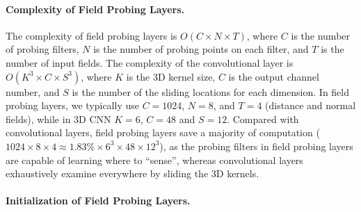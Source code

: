 
\paragraph{Complexity of Field Probing Layers.} The complexity of field probing layers is $O(C \times N \times T)$, where $C$ is the number of probing filters, $N$ is the number of probing points on each filter, and $T$ is the number of input fields. The complexity of the convolutional layer is $O(K^3 \times C \times S^3)$, where $K$ is the 3D kernel size, $C$ is the output channel number, and $S$ is the number of the sliding locations for each dimension. In field probing layers, we typically use $C = 1024$, $N = 8$, and $T=4$ (distance and normal fields), while in 3D CNN $K=6$, $C = 48$ and $S=12$. Compared with convolutional layers, field probing layers save a majority of computation ($1024 \times 8 \times 4 \approx 1.83\% \times 6^3 \times 48 \times 12^3$), as the probing filters in field probing layers are capable of learning where to ``sense'', whereas convolutional layers exhaustively examine everywhere by sliding the 3D kernels.

\paragraph{Initialization of Field Probing Layers.}

